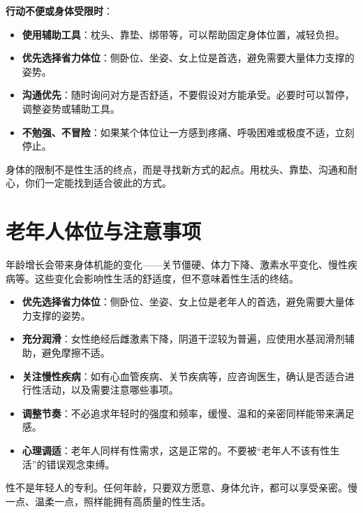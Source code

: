 \documentclass[12pt,UTF8]{ctexbook}
\begin{document}
\textbf{行动不便或身体受限时}：

\begin{itemize}
\item \textbf{使用辅助工具}：枕头、靠垫、绑带等，可以帮助固定身体位置，减轻负担。
\item \textbf{优先选择省力体位}：侧卧位、坐姿、女上位是首选，避免需要大量体力支撑的姿势。
\item \textbf{沟通优先}：随时询问对方是否舒适，不要假设对方能承受。必要时可以暂停，调整姿势或辅助工具。
\item \textbf{不勉强、不冒险}：如果某个体位让一方感到疼痛、呼吸困难或极度不适，立刻停止。
\end{itemize}

\begin{tcolorbox}[colback=pink!5!white,colframe=red!50!black,title=贴心小叮咛]
身体的限制不是性生活的终点，而是寻找新方式的起点。用枕头、靠垫、沟通和耐心，你们一定能找到适合彼此的方式。
\end{tcolorbox}

\section{老年人体位与注意事项}

年龄增长会带来身体机能的变化——关节僵硬、体力下降、激素水平变化、慢性疾病等。这些变化会影响性生活的舒适度，但不意味着性生活的终结。

\begin{itemize}
\item \textbf{优先选择省力体位}：侧卧位、坐姿、女上位是老年人的首选，避免需要大量体力支撑的姿势。
\item \textbf{充分润滑}：女性绝经后雌激素下降，阴道干涩较为普遍，应使用水基润滑剂辅助，避免摩擦不适。
\item \textbf{关注慢性疾病}：如有心血管疾病、关节疾病等，应咨询医生，确认是否适合进行性活动，以及需要注意哪些事项。
\item \textbf{调整节奏}：不必追求年轻时的强度和频率，缓慢、温和的亲密同样能带来满足感。
\item \textbf{心理调适}：老年人同样有性需求，这是正常的。不要被“老年人不该有性生活”的错误观念束缚。
\end{itemize}

\begin{tcolorbox}[colback=pink!5!white,colframe=red!50!black,title=贴心小叮咛]
性不是年轻人的专利。任何年龄，只要双方愿意、身体允许，都可以享受亲密。慢一点、温柔一点，照样能拥有高质量的性生活。
\end{tcolorbox}
\end{document}
